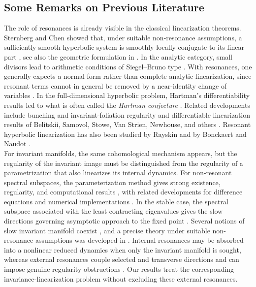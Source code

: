 \documentclass{amsart}
\theoremstyle{plain}
\theoremstyle{definition}
\begin{document}
\subsection{Some Remarks on Previous Literature}\label{intro_literature}

The role of resonances is already visible in the classical linearization theorems. Sternberg and Chen showed that, under suitable non-resonance assumptions, a sufficiently smooth hyperbolic system is smoothly locally conjugate to its linear part \cite{chen1963equivalence,chen1965local,sternberg1957local}, see also the geometric formulation in \cite{banyaga1996cohomology}. In the analytic category, small divisors lead to arithmetic conditions of Siegel--Bruno type \cite{siegel1942iteration,bruno1971analytic}. With resonances, one generally expects a normal form rather than complete analytic linearization, since resonant terms cannot in general be removed by a near-identity change of variables \cite{arnold2012geometrical,carr2012applications}. In the full-dimensional hyperbolic problem, Hartman's differentiability results led to what is often called the \emph{Hartman conjecture} \cite{hartman1960lemma,hartman1960local,pugh1969theorem}. Related developments include bunching and invariant-foliation regularity \cite{hasselblatt1994periodic,pugh1997holder} and differentiable linearization results of Belitskii, Samovol, Stowe, Van Strien, Newhouse, and others \cite{belitskii1978equivalence,samovol2010polynomial,samovol2010new,stowe1988linearization,vanstrien1990smooth,newhouse2017hartman,zhang2017differentiability}. Resonant hyperbolic linearization has also been studied by Rayskin and by Bonckaert and Naudot \cite{rayskin1998alpha,bonckaert2003linearization}.\\

For invariant manifolds, the same cohomological mechanism appears, but the regularity of the invariant image must be distinguished from the regularity of a parametrization that also linearizes its internal dynamics. For non-resonant spectral subspaces, the parameterization method gives strong existence, regularity, and computational results \cite{Cab2003pam,Cab2003,CABRE2005444}, with related developments for difference equations and numerical implementations \cite{delaLlaveLomeli2012,gonzalez2022finite}. In the stable case, the spectral subspace associated with the least contracting eigenvalues gives the slow directions governing asymptotic approach to the fixed point \cite{Wayne97}. Several notions of slow invariant manifold coexist \cite{lorenz1986existence,lorenz1987nonexistence,lorenz1992slow}, and a precise theory under suitable non-resonance assumptions was developed in \cite{Llave97,Cab2003,CABRE2005444}. Internal resonances may be absorbed into a nonlinear reduced dynamics when only the invariant manifold is sought, whereas external resonances couple selected and transverse directions and can impose genuine regularity obstructions \cite{belitskii1978equivalence,samovol2010polynomial,samovol2010new,homburg2006invariant}. Our results treat the corresponding invariance-linearization problem without excluding these external resonances.\\
\end{document}
